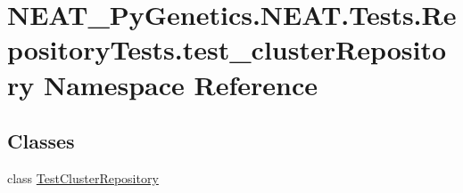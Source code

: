 \hypertarget{namespaceNEAT__PyGenetics_1_1NEAT_1_1Tests_1_1RepositoryTests_1_1test__clusterRepository}{}\section{N\+E\+A\+T\+\_\+\+Py\+Genetics.\+N\+E\+A\+T.\+Tests.\+Repository\+Tests.\+test\+\_\+cluster\+Repository Namespace Reference}
\label{namespaceNEAT__PyGenetics_1_1NEAT_1_1Tests_1_1RepositoryTests_1_1test__clusterRepository}
\subsection*{Classes}
\begin{DoxyCompactItemize}
\item 
class \hyperlink{classNEAT__PyGenetics_1_1NEAT_1_1Tests_1_1RepositoryTests_1_1test__clusterRepository_1_1TestClusterRepository}{Test\+Cluster\+Repository}
\end{DoxyCompactItemize}
